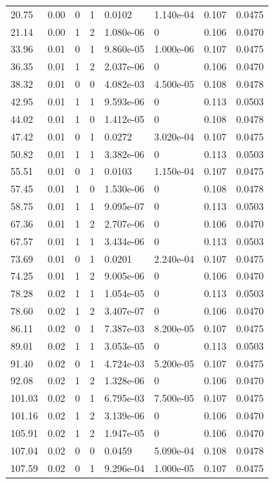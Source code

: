 \documentclass[preview]{standalone}
\begin{document}
{{\begin{tabular}{L{1.2cm}C{1.2cm} C{0.3cm}C{0.5cm} C{1.4cm}C{1.4cm} C{1.4cm}C{1.4cm}}
  20.75  &  0.00  & 0     &  1 &  0.0102  & 1.140e-04  & 0.107 &  0.0475   \\ 
  21.14  &  0.00  & 1     &  2 &  1.080e-06  & 0  & 0.106 &  0.0470   \\ 
  33.96  &  0.01  & 0     &  1 &  9.860e-05  & 1.000e-06  & 0.107 &  0.0475   \\ 
  36.35  &  0.01  & 1     &  2 &  2.037e-06  & 0  & 0.106 &  0.0470   \\ 
  38.32  &  0.01  & 0     &  0 &  4.082e-03  & 4.500e-05  & 0.108 &  0.0478   \\ 
  42.95  &  0.01  & 1     &  1 &  9.593e-06  & 0  & 0.113 &  0.0503   \\ 
  44.02  &  0.01  & 1     &  0 &  1.412e-05  & 0  & 0.108 &  0.0478   \\ 
  47.42  &  0.01  & 0     &  1 &  0.0272  & 3.020e-04  & 0.107 &  0.0475   \\ 
  50.82  &  0.01  & 1     &  1 &  3.382e-06  & 0  & 0.113 &  0.0503   \\ 
  55.51  &  0.01  & 0     &  1 &  0.0103  & 1.150e-04  & 0.107 &  0.0475   \\ 
  57.45  &  0.01  & 1     &  0 &  1.530e-06  & 0  & 0.108 &  0.0478   \\ 
  58.75  &  0.01  & 1     &  1 &  9.095e-07  & 0  & 0.113 &  0.0503   \\ 
  67.36  &  0.01  & 1     &  2 &  2.707e-06  & 0  & 0.106 &  0.0470   \\ 
  67.57  &  0.01  & 1     &  1 &  3.434e-06  & 0  & 0.113 &  0.0503   \\ 
  73.69  &  0.01  & 0     &  1 &  0.0201  & 2.240e-04  & 0.107 &  0.0475   \\ 
  74.25  &  0.01  & 1     &  2 &  9.005e-06  & 0  & 0.106 &  0.0470   \\ 
  78.28  &  0.02  & 1     &  1 &  1.054e-05  & 0  & 0.113 &  0.0503   \\ 
  78.60  &  0.02  & 1     &  2 &  3.407e-07  & 0  & 0.106 &  0.0470   \\ 
  86.11  &  0.02  & 0     &  1 &  7.387e-03  & 8.200e-05  & 0.107 &  0.0475   \\ 
  89.01  &  0.02  & 1     &  1 &  3.053e-05  & 0  & 0.113 &  0.0503   \\ 
  91.40  &  0.02  & 0     &  1 &  4.724e-03  & 5.200e-05  & 0.107 &  0.0475   \\ 
  92.08  &  0.02  & 1     &  2 &  1.328e-06  & 0  & 0.106 &  0.0470   \\ 
  101.03  &  0.02  & 0     &  1 &  6.795e-03  & 7.500e-05  & 0.107 &  0.0475   \\ 
  101.16  &  0.02  & 1     &  2 &  3.139e-06  & 0  & 0.106 &  0.0470   \\ 
  105.91  &  0.02  & 1     &  2 &  1.947e-05  & 0  & 0.106 &  0.0470   \\ 
  107.04  &  0.02  & 0     &  0 &  0.0459  & 5.090e-04  & 0.108 &  0.0478   \\ 
  107.59  &  0.02  & 0     &  1 &  9.296e-04  & 1.000e-05  & 0.107 &  0.0475   \\ 
\hline 
\end{tabular} 

}}
\end{document}
